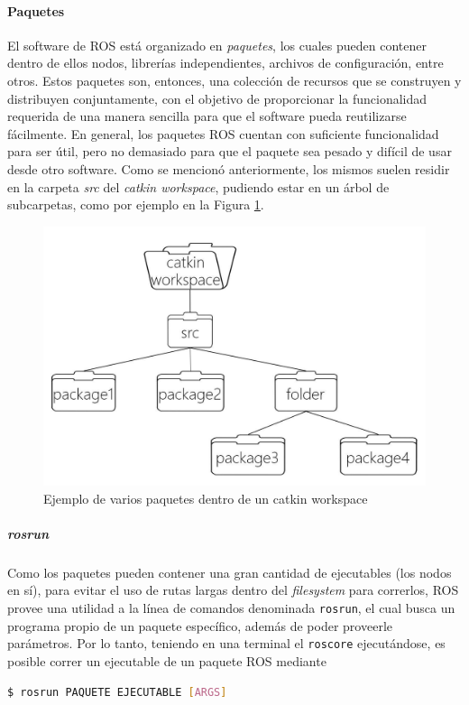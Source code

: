 \paragraph{Paquetes}
El software de ROS está organizado en \textit{paquetes}, los cuales pueden contener dentro de ellos nodos, librerías independientes, archivos de configuración, entre otros. Estos paquetes son, entonces, una colección de recursos que se construyen y distribuyen conjuntamente, con el objetivo de proporcionar la funcionalidad requerida de una manera sencilla para que el software pueda reutilizarse fácilmente. En general, los paquetes ROS cuentan con suficiente funcionalidad para ser útil, pero no demasiado para que el paquete sea pesado y difícil de usar desde otro software. Como se mencionó anteriormente, los mismos suelen residir en la carpeta \textit{src} del \textit{catkin workspace}, pudiendo estar en un árbol de subcarpetas, como por ejemplo en la Figura \ref{fig:catkinworkspacewithpackages}.
\begin{figure}[!ht]
    \centering
    \includegraphics[width=\linewidth]{Img/CatkinWorkspaceWithPackages.jpeg}
    \caption{Ejemplo de varios paquetes dentro de un catkin workspace}
    \label{fig:catkinworkspacewithpackages}
\end{figure}

\subparagraph{rosrun}
Como los paquetes pueden contener una gran cantidad de ejecutables (los nodos en sí), para evitar el uso de rutas largas dentro del \textit{filesystem} para correrlos, ROS provee una utilidad a la línea de comandos denominada \texttt{rosrun}, el cual busca un programa propio de un paquete específico, además de poder proveerle parámetros. Por lo tanto, teniendo en una terminal el \texttt{roscore} ejecutándose, es posible correr un ejecutable de un paquete ROS mediante
\begin{lstlisting}[language=bash]
  $ rosrun PAQUETE EJECUTABLE [ARGS]
\end{lstlisting}

